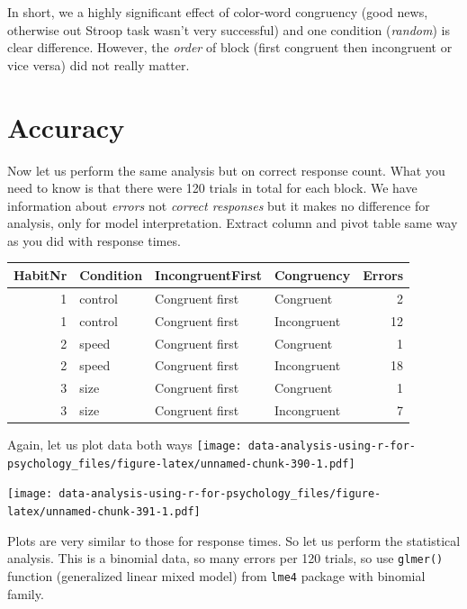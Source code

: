 \documentclass[
]{book}
\begin{document}
In short, we a highly significant effect of color-word congruency (good news, otherwise out Stroop task wasn't very successful) and one condition (\emph{random}) is clear difference. However, the \emph{order} of block (first congruent then incongruent or vice versa) did not really matter.

\hypertarget{accuracy}{%
\section{Accuracy}\label{accuracy}}

Now let us perform the same analysis but on correct response count. What you need to know is that there were 120 trials in total for each block. We have information about \emph{errors} not \emph{correct responses} but it makes no difference for analysis, only for model interpretation. Extract column and pivot table same way as you did with response times.

\begin{tabular}{r|l|l|l|r}
\hline
HabitNr & Condition & IncongruentFirst & Congruency & Errors\\
\hline
1 & control & Congruent first & Congruent & 2\\
\hline
1 & control & Congruent first & Incongruent & 12\\
\hline
2 & speed & Congruent first & Congruent & 1\\
\hline
2 & speed & Congruent first & Incongruent & 18\\
\hline
3 & size & Congruent first & Congruent & 1\\
\hline
3 & size & Congruent first & Incongruent & 7\\
\hline
\end{tabular}

Again, let us plot data both ways
\texttt{[image: data-analysis-using-r-for-psychology\_files/figure-latex/unnamed-chunk-390-1.pdf]}

\texttt{[image: data-analysis-using-r-for-psychology\_files/figure-latex/unnamed-chunk-391-1.pdf]}

Plots are very similar to those for response times. So let us perform the statistical analysis. This is a binomial data, so many errors per 120 trials, so use \texttt{glmer()} function (generalized linear mixed model) from \texttt{lme4} package with binomial family.
\end{document}
